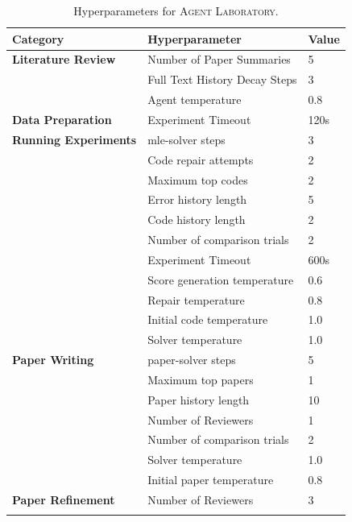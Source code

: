 \documentclass[11pt, a4paper]{gdm_format}
\begin{document}
\begin{table}[h!]
\centering
\caption{Hyperparameters for \textsc{Agent Laboratory}.}
\begin{tabular}{@{}lll@{}}
\toprule
\textbf{Category}        & \textbf{Hyperparameter}                          & \textbf{Value}       \\ \midrule
\textbf{Literature Review} & Number of Paper Summaries                       & 5                    \\
& Full Text History Decay Steps & 3                   \\ 
& Agent temperature          & 0.8                    \\ \midrule
\textbf{Data Preparation} & 
 Experiment Timeout                               & 120s         \\ \midrule
\textbf{Running Experiments}   & mle-solver steps     & 3                   \\
& Code repair attempts          & 2                    \\ 
& Maximum top codes          & 2                    \\ 
& Error history length          & 5                    \\ 
& Code history length          & 2                    \\ 
& Number of comparison trials          & 2                    \\ 
& Experiment Timeout                               & 600s         \\
& Score generation temperature          & 0.6                    \\ 
& Repair temperature          & 0.8                    \\ 
& Initial code temperature          & 1.0                    \\ 
& Solver temperature          & 1.0                    \\ \midrule
\textbf{Paper Writing}        & paper-solver steps                            & 5 \\        & Maximum top papers                            & 1                    \\
& Paper history length                       & 10                    \\
& Number of Reviewers                      & 1                    \\
& Number of comparison trials                                  & 2                  \\ 
& Solver temperature          & 1.0                    \\ 
& Initial paper temperature          & 0.8                    \\ \midrule
\textbf{Paper Refinement}
& Number of Reviewers                      & 3                    \\                \\ \bottomrule
\end{tabular}
\end{table}
\end{document}
